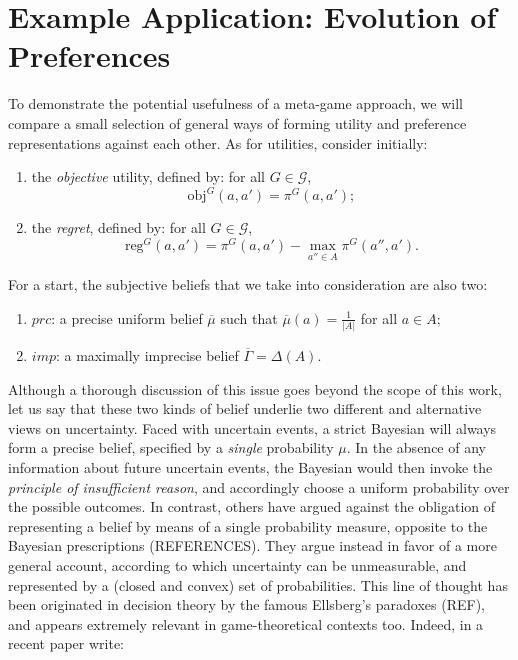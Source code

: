 \documentclass[fleqn,reqno,12pt]{article}
\theoremstyle{Satz}
\theoremstyle{Bsp}
\begin{document}
\section{Example Application: Evolution of Preferences} \label{sec:model}

To demonstrate the potential usefulness of a meta-game approach, we will compare a small
selection of general ways of forming utility and preference representations against each
other. As for utilities, consider initially:
\begin{enumerate}
\item the \textit{objective} utility, defined by: for all $G \in \mathcal{G}$,
$$\text{obj}^G(a,a')=\pi^G(a,a');$$
\item the \textit{regret}, defined by: for all $G \in \mathcal{G}$,
$$\text{reg}^G(a,a') =\pi^G(a,a')- \max_{a''\in A} \pi^G(a'',a').$$
\end{enumerate}

For a start, the subjective beliefs that we take into consideration are also two:
\begin{enumerate}
\item $prc$: a precise uniform belief $\overline{\mu}$ such that $\overline{\mu}(a)=\frac{1}{|A|}$ for all $a\in A$;
\item $imp$: a maximally imprecise belief $\overline{\Gamma}=\Delta(A)$.
\end{enumerate}

Although a thorough discussion of this issue goes beyond the scope of this work, let us say
that these two kinds of belief underlie two different and alternative views on
uncertainty. Faced with uncertain events, a strict Bayesian will always form a precise belief,
specified by a \textit{single} probability $\mu$. In the absence of any information about
future uncertain events, the Bayesian would then invoke the \textit{principle of insufficient
  reason}, and accordingly choose a uniform probability over the possible outcomes. In
contrast, others have argued against the obligation of representing a belief by means of a
single probability measure, opposite to the Bayesian prescriptions (REFERENCES). They argue
instead in favor of a more general account, according to which uncertainty can be unmeasurable,
and represented by a (closed and convex) set of probabilities. This line of thought has been
originated in decision theory by the famous Ellsberg's paradoxes (REF), and appears extremely
relevant in game-theoretical contexts too. Indeed, in a recent paper \citet{BattCerrMM15}
write:
\end{document}
